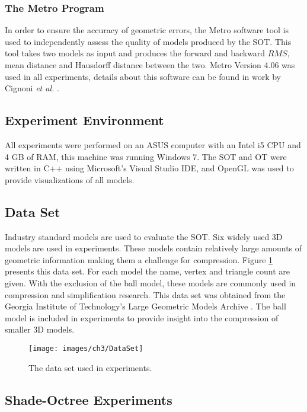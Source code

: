 \subsubsection{The Metro Program}

In order to ensure the accuracy of geometric errors, the Metro software tool is used to independently assess the quality of models produced by the SOT. This tool takes two models as input and produces the forward and backward $RMS$, mean distance and Hausdorff distance between the two. Metro Version 4.06 was used in all experiments, details about this software can be found in work by Cignoni \textit{et al.} \cite{Cignoni98Metro}.

\subsection{Experiment Environment}

All experiments were performed on an ASUS computer with an Intel i5 CPU and 4 GB of RAM, this machine was running Windows 7. The SOT and OT were written in C++ using Microsoft's Visual Studio IDE, and OpenGL was used to provide visualizations of all models.

\subsection{Data Set}

Industry standard models are used to evaluate the SOT. Six widely used 3D models are used in experiments. These models contain relatively large amounts of geometric information making them a challenge for compression. Figure \ref{dataset} presents this data set. For each model the name, vertex and triangle count are given. With the exclusion of the ball model, these models are commonly used in compression and simplification research. This data set was obtained from the Georgia Institute of Technology's Large Geometric Models Archive \cite{LargeGeometricModelsArchive}. The ball model is included in experiments to provide insight into the compression of smaller 3D models. 

\begin{figure}[!h]
\centering
\texttt{[image: images/ch3/DataSet]}
\caption{The data set used in experiments.}
\label{dataset}
\end{figure}

\subsection{Shade-Octree Experiments}

